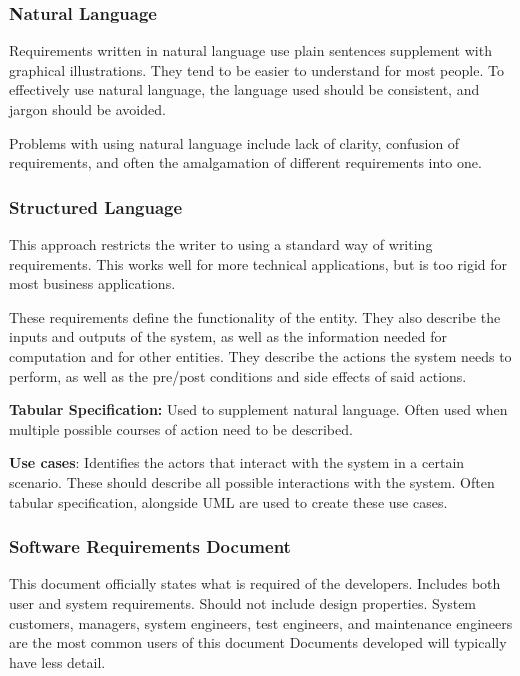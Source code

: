 \documentclass[12pt]{article}
\begin{document}
\subsubsection*{Natural Language}

Requirements written in natural language use plain sentences supplement with graphical illustrations. They tend to be easier to understand for most people. To effectively use natural language, the language used should be consistent, and jargon should be avoided.

Problems with using natural language include lack of clarity, confusion of requirements, and often the amalgamation of different requirements into one.

\subsubsection*{Structured Language}

This approach restricts the writer to using a standard way of writing requirements. This works well for more technical applications, but is too rigid for most business applications.

These requirements define the functionality of the entity. They also describe the inputs and outputs of the system, as well as the information needed for computation and for other entities. They describe the actions the system needs to perform, as well as the pre/post conditions and side effects of said actions.

\textbf{Tabular Specification:} Used to supplement natural language. Often used when multiple possible courses of action need to be described.

\textbf{Use cases}: Identifies the actors that interact with the system in a certain scenario. These should describe all possible interactions with the system. Often tabular specification, alongside UML are used to create these use cases.

\pagebreak
\subsubsection*{Software Requirements Document}

This document officially states what is required of the developers. Includes both user and system requirements. Should not include design properties. System customers, managers, system engineers, test engineers, and maintenance engineers are the most common users of this document Documents developed will typically have less detail.
\end{document}
